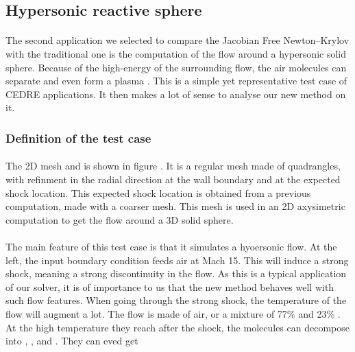     \subsection{Hypersonic reactive sphere}

      \paragraph{}
      The second application we selected to compare the Jacobian Free Newton--Krylov with the traditional one is the computation of the flow around a hypersonic solid sphere.
      Because of the high-energy of the surrounding flow, the air molecules can separate and even form a plasma .
      This is a simple yet representative test case of CEDRE applications.
      It then makes a lot of sense to analyse our new method on it.

      \subsubsection{Definition of the test case}


        \paragraph{}
        The 2D mesh and is shown in figure .
        It is a regular mesh made of quadrangles, with refinment in the radial direction at the wall boundary and at the expected shock location.
        This expected shock location is obtained from a previous computation, made with a coarser mesh.
        This mesh is used in an 2D axysimetric computation to get the flow around a 3D solid sphere.

        \paragraph{}
        The main feature of this test case is that it simulates a hyoersonic flow.
        At the left, the input boundary condition feeds air at Mach 15.
        This will induce a strong shock, meaning a strong discontinuity in the flow.
        As this is a typical application of our solver, it is of importance to us that the new method behaves well with such flow features.
        When going through the strong shock, the temperature of the flow will augment a lot.
        The flow is made of air, or a mixture of 77\%  and 23\% .
        At the high temperature they reach after the shock, the molecules can decompose into , , and .
        They can eved get 




